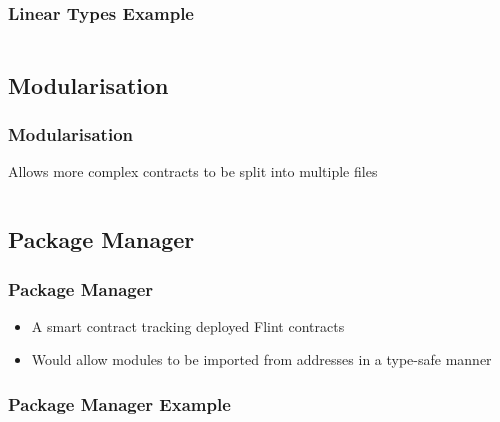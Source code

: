 \documentclass[aspectratio=169]{beamer}
\begin{document}
\begin{frame}
\frametitle{Linear Types Example}
\inputminted{swift}{code/linear-types.flint}
\end{frame}


\subsection{Modularisation}

\begin{frame}
\frametitle{Modularisation}
Allows more complex contracts to be split into multiple files \\
\inputminted{swift}{code/modularisation.flint}
\end{frame}

\subsection{Package Manager}

\begin{frame}
\frametitle{Package Manager}
\begin{itemize}
    \item A smart contract tracking deployed Flint contracts
    \item Would allow modules to be imported from addresses in a type-safe manner
\end{itemize}
\end{frame}

\begin{frame}
\frametitle{Package Manager Example}
\inputminted{swift}{code/fpm.flint}
\end{frame}
\end{document}
